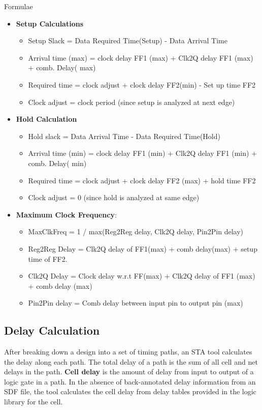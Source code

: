 \clearpage

Formulae
\begin{itemize}
    \item \textbf{Setup Calculations} 
    \begin{itemize}
        \item Setup Slack = Data Required Time(Setup) - Data Arrival Time
        \item Arrival time (max) = clock delay FF1 (max) + Clk2Q delay FF1 (max) + comb. Delay( max)
        \item Required time = clock adjust + clock delay FF2(min) - Set up time FF2
        \item Clock adjust = clock period (since setup is analyzed at next edge)
    \end{itemize}

    \item \textbf{Hold Calculation}
    \begin{itemize}
        \item Hold slack = Data Arrival Time - Data Required Time(Hold)
        \item Arrival time (min) = clock delay FF1 (min) + Clk2Q delay FF1 (min) + comb. Delay( min)
        \item Required time = clock adjust + clock delay FF2 (max) + hold time FF2
        \item Clock adjust = 0 (since hold is analyzed at same edge)
    \end{itemize}

    \item \textbf{Maximum Clock Frequency}:
    \begin{itemize}
        \item MaxClkFreq = 1 / max(Reg2Reg delay, Clk2Q delay, Pin2Pin delay)
        \item Reg2Reg Delay = Clk2Q delay of FF1(max) + comb delay(max) + setup time of FF2.
        \item Clk2Q Delay = Clock delay w.r.t FF(max) + Clk2Q delay of FF1 (max) + comb delay (max)
        \item Pin2Pin delay = Comb delay between input pin to output pin (max)
    \end{itemize}
\end{itemize}

\clearpage

\subsection{Delay Calculation}
After breaking down a design into a set of timing paths, an STA tool calculates the delay along each path. The total delay of a path is the sum of all cell and net delays in the path. \textbf{Cell delay} is the amount of delay from input to output of a logic gate in a path. In the absence of back-annotated delay information from an SDF file, the tool calculates the cell delay from delay tables provided in the logic library for the cell.

